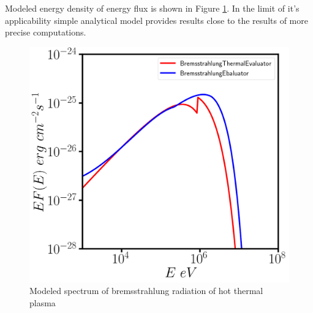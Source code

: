 Modeled energy density of energy flux is shown in Figure \ref{bremsstrahlungFigure}. In the limit of it's applicability simple analytical model provides results close to the results of more precise computations.

\begin{figure}
	\centering
	\includegraphics[width=12.5 cm]{./fig_en/bremsstrahlung.png} 
	\caption{Modeled spectrum of bremsstrahlung radiation of hot thermal plasma}
	\label{bremsstrahlungFigure}
\end{figure}

